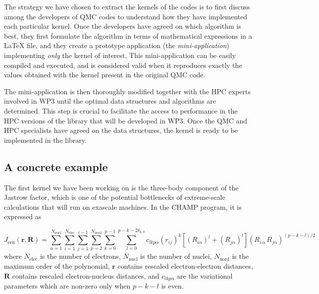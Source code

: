 The strategy we have chosen to extract the kernels of the codes is to
first discuss among the developers of \ac{QMC} codes to understand how they have
implemented each particular kernel. Once the developers have agreed on
which algorithm is best, they first formulate the algorithm in terms
of mathematical expressions in a {\LaTeX} file, and they create a prototype application 
(the \emph{mini-application}) implementing \emph{only} the kernel of
interest. This mini-application can be easily compiled and executed,
and is considered valid when it reproduces exactly the values obtained
with the kernel present in the original \ac{QMC} code.

The mini-application is then thoroughly modified together with the
\ac{HPC} experts involved in \ac{WP}3 until the optimal data
structures and algorithms are determined. This step is crucial to
facilitate the access to performance in the \ac{HPC} versions of the
library that will be developed in \ac{WP}3.  Once the \ac{QMC} and
\ac{HPC} specialists have agreed on the data structures, the kernel is
ready to be implemented in the
library.


\subsection{A concrete example}

The first kernel we have been working on is the three-body component of
the Jastrow factor, which is one of the potential bottlenecks of
extreme-scale calculations that will run on exascale machines.
In the CHAMP program, it is expressed as

\newcommand{\Jeen}{J_{\text{een}}}
\newcommand{\Nel}{N_{\text{elec}}}
\newcommand{\Nat}{N_{\text{nucl}}}
\newcommand{\Nord}{N_{\text{nord}}}
\newcommand{\lmax}{p-k-2\delta_{k,0}}
\newcommand{\br}{\mathbf{r}}
\newcommand{\bR}{\mathbf{R}}
\[
  \Jeen (\br,\bR) = \sum_{\alpha=1}^{\Nat} \sum_{i=1}^{\Nel} \sum_{j=1}^{i-1}
\sum_{p=2}^{\Nord} \sum_{k=0}^{p-1}
\sum_{l=0}^{\lmax} c_{lkp\alpha}
\left( {r}_{ij} \right)^k
\left[ \left( {R}_{i\alpha} \right)^l + \left( {R}_{j\alpha} \right)^l \right]
\left( {R}_{i\,\alpha} \, {R}_{j\alpha} \right)^{(p-k-l)/2} 
\]
where
$\Nel$ is the number of electrons, 
$\Nat$ is the number of nuclei,
$\Nord$ is the maximum order of the polynomial, 
$\br$ contains rescaled electron-electron distances, 
$\bR$ contains rescaled electron-nucleus distances,
and $c_{lkp\alpha}$ are the variational parameters which are non-zero
only when $p-k-l$ is even.

